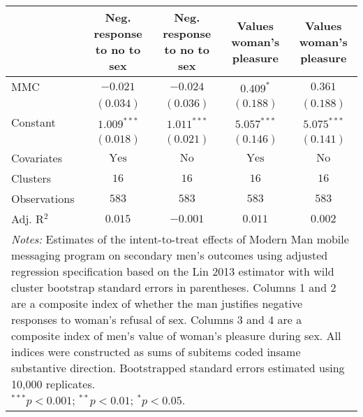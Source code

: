 
\begin{tabular}{l c c c c}
\toprule
 & Neg. response to no to sex & Neg. response to no to sex & Values woman's pleasure & Values woman's pleasure \\
\midrule
MMC          & $-0.021$       & $-0.024$      & $0.409^{*}$    & $0.361$       \\
             & $(0.034)$      & $(0.036)$     & $(0.188)$      & $(0.188)$     \\
Constant     & $1.009^{***}$  & $1.011^{***}$ & $5.057^{***}$  & $5.075^{***}$ \\
             & $(0.018)$      & $(0.021)$     & $(0.146)$      & $(0.141)$     \\
\midrule
Covariates   & $\textrm{Yes}$ & $\textrm{No}$ & $\textrm{Yes}$ & $\textrm{No}$ \\
Clusters     & $16$           & $16$          & $16$           & $16$          \\
Observations & $583$          & $583$         & $583$          & $583$         \\
Adj. R$^2$   & $0.015$        & $-0.001$      & $0.011$        & $0.002$       \\
\bottomrule
\multicolumn{5}{l}{\scriptsize{\parbox{\linewidth}{\vspace{2pt}
       \textit{Notes:} Estimates of the intent-to-treat effects of Modern Man mobile
       messaging program on secondary men's outcomes using adjusted regression
       specification based on the Lin 2013 estimator with wild cluster bootstrap
       standard errors in parentheses. Columns 1 and 2 are a composite index of
       whether the man justifies negative responses to woman's refusal of sex. Columns 3 and 4
       are a composite index of men's value of woman's pleasure during sex. All indices were
       constructed as sums of subitems coded insame substantive direction. 
       Bootstrapped standard errors estimated using 10,000 replicates. \\ $^{***}p<0.001$; $^{**}p<0.01$; $^{*}p<0.05$.}}}
\end{tabular}
